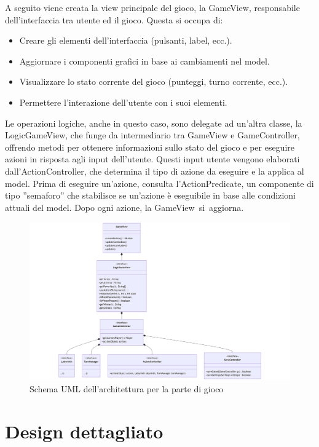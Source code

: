 \documentclass[a4paper,12pt]{report}
\begin{document}
A seguito viene creata la view principale del gioco, la GameView, responsabile dell’interfaccia tra utente ed il gioco. Questa si occupa di:
\begin{itemize}
	\item Creare gli elementi dell’interfaccia (pulsanti, label, ecc.).
	\item Aggiornare i componenti grafici in base ai cambiamenti nel model.
	\item Visualizzare lo stato corrente del gioco (punteggi, turno corrente, ecc.).
	\item Permettere l’interazione dell’utente con i suoi elementi.
\end{itemize}
Le operazioni logiche, anche in questo caso, sono delegate ad un’altra classe, la LogicGameView, che funge da intermediario tra GameView e GameController, 
offrendo metodi per ottenere informazioni sullo stato del gioco e per eseguire azioni in risposta agli input dell’utente.
Questi input utente vengono elaborati dall’ActionController, che determina il tipo di azione da eseguire e la applica al model. 
Prima di eseguire un’azione, consulta l’ActionPredicate, un componente di tipo ”semaforo” che stabilisce se un’azione è eseguibile 
in base alle condizioni attuali del model. Dopo ogni azione, la GameView si aggiorna.
\begin{figure}[H]
	\centering{}
	\includegraphics[width=14cm]{img/ArchitetturaGameView.png}
	\caption{Schema UML dell'architettura per la parte di gioco}
	\label{img:Architettura GameView}
\end{figure}

\section{Design dettagliato}
\end{document}
